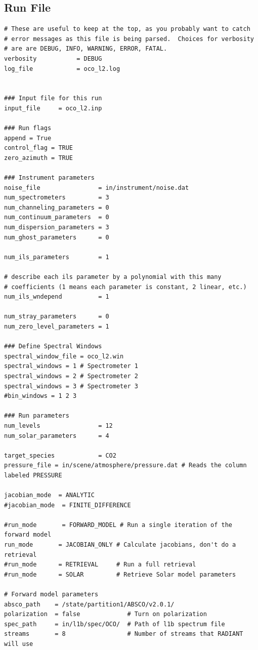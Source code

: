 \documentclass{article}
\begin{document}
\subsection{Run File}
\begin{verbatim}
# These are useful to keep at the top, as you probably want to catch
# error messages as this file is being parsed.  Choices for verbosity
# are are DEBUG, INFO, WARNING, ERROR, FATAL.
verbosity           = DEBUG
log_file            = oco_l2.log


### Input file for this run
input_file     = oco_l2.inp

### Run flags
append = True
control_flag = TRUE
zero_azimuth = TRUE

### Instrument parameters
noise_file                = in/instrument/noise.dat
num_spectrometers         = 3
num_channeling_parameters = 0
num_continuum_parameters  = 0
num_dispersion_parameters = 3
num_ghost_parameters      = 0

num_ils_parameters        = 1

# describe each ils parameter by a polynomial with this many
# coefficients (1 means each parameter is constant, 2 linear, etc.)
num_ils_wndepend          = 1  

num_stray_parameters      = 0
num_zero_level_parameters = 1

### Define Spectral Windows
spectral_window_file = oco_l2.win
spectral_windows = 1 # Spectrometer 1
spectral_windows = 2 # Spectrometer 2
spectral_windows = 3 # Spectrometer 3
#bin_windows = 1 2 3

### Run parameters
num_levels                = 12
num_solar_parameters      = 4

target_species            = CO2
pressure_file = in/scene/atmosphere/pressure.dat # Reads the column labeled PRESSURE

jacobian_mode  = ANALYTIC
#jacobian_mode  = FINITE_DIFFERENCE

#run_mode       = FORWARD_MODEL # Run a single iteration of the forward model 
run_mode       = JACOBIAN_ONLY # Calculate jacobians, don't do a retrieval
#run_mode      = RETRIEVAL     # Run a full retrieval
#run_mode      = SOLAR         # Retrieve Solar model parameters

# Forward model parameters
absco_path    = /state/partition1/ABSCO/v2.0.1/
polarization  = false             # Turn on polarization
spec_path     = in/l1b/spec/OCO/  # Path of l1b spectrum file
streams       = 8                 # Number of streams that RADIANT will use


\end{verbatim}
\end{document}
